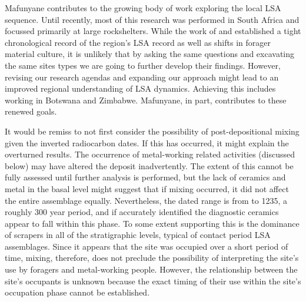 
Mafunyane contributes to the  growing body of work exploring the local LSA sequence. 
Until recently, most of this research was performed in South Africa and focussed primarily at large rockshelters. 
While the work of \textcite{Hall_2000} and \textcites{vanDoornum_2007}{vanDoornum_2008}{vanDoornum_2014} established a tight chronological record of the region’s LSA record as well as shifts in forager material culture, it is unlikely that by asking the same questions and excavating the same sites types we are going to further develop their findings. However, revising our research agendas and expanding our approach might lead to an improved regional understanding of LSA dynamics. Achieving this includes working in Botswana and Zimbabwe. Mafunyane, in part, contributes to these renewed goals. 

It would be remiss to not first consider the possibility of post-depositional mixing given the inverted radiocarbon dates. If this has occurred, it might explain the overturned results. The occurrence of metal-working related activities (discussed below) may have altered the deposit inadvertently. The extent of this cannot be fully assessed until further analysis is performed, but the lack of ceramics and metal in the basal level might suggest that if mixing occurred, it did not affect the entire assemblage equally. Nevertheless, the dated range is from  to 1235, a roughly 300 year period, and if accurately identified the diagnostic ceramics appear to fall within this phase. To some extent supporting this is the dominance of scrapers in all of the stratigraphic levels, typical of contact period LSA assemblages. Since it appears that the site was occupied over a short period of time, mixing, therefore, does not preclude the possibility of interpreting the site’s use by foragers and metal-working people. However, the relationship between the site’s occupants is unknown because the exact timing of their use within the site’s occupation phase cannot be established. 

